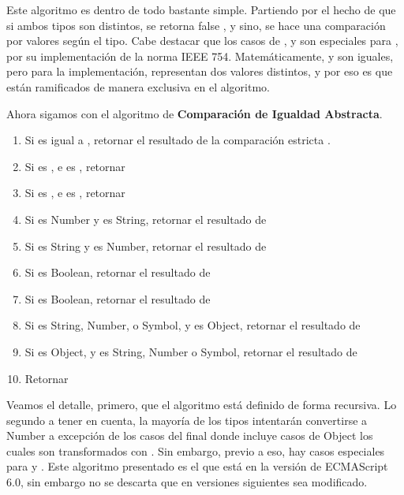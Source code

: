 Este algoritmo es dentro de todo bastante simple. Partiendo por el hecho de que si ambos tipos son distintos, se retorna false , y sino, se hace una comparación por valores según el tipo. Cabe destacar que los casos de ,  y  son especiales para , por su implementación de la norma IEEE 754. Matemáticamente,  y  son iguales, pero para la implementación, representan dos valores distintos, y por eso es que están ramificados de manera exclusiva en el algoritmo.

Ahora sigamos con el algoritmo de \textbf{Comparación de Igualdad Abstracta}.

\begin{enumerate}
\item Si  es igual a , retornar el resultado de la comparación estricta .
\item Si  es , e  es , retornar 
\item Si  es , e  es , retornar 
\item Si  es Number y  es String, retornar el resultado de 
\item Si  es String y  es Number, retornar el resultado de 
\item Si  es Boolean, retornar el resultado de 
\item Si  es Boolean, retornar el resultado de 
\item Si  es String, Number, o Symbol, y  es Object, retornar el resultado de 
\item Si  es Object, y  es String, Number o Symbol, retornar el resultado de 
\item Retornar 
\end{enumerate}

Veamos el detalle, primero, que el algoritmo está definido de forma recursiva. Lo segundo a tener en cuenta, la mayoría de los tipos intentarán convertirse a Number a excepción de los casos del final donde incluye casos de Object los cuales son transformados con . Sin embargo, previo a eso, hay casos especiales para  y . Este algoritmo presentado es el que está en la versión de ECMAScript 6.0, sin embargo no se descarta que en versiones siguientes sea modificado.

